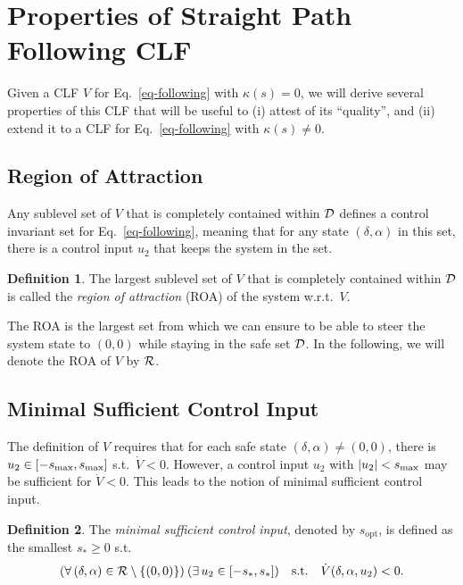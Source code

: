 \documentclass{article}
\theoremstyle{plain}
\theoremstyle{definition}
\newtheorem{definition}{Definition}
\theoremstyle{remark}
\newcommand{\smax}{s_\maxtxt}
\newcommand{\sopt}{s_{\mathrm{opt}}}
\begin{document}
\section{Properties of Straight Path Following CLF}\label{sec-straight-CLF}

Given a CLF $V$ for Eq.~\eqref{eq-following} with $\kappa(s)=0$, we will derive
several properties of this CLF that will be useful to (i) attest of its ``quality'',
and (ii) extend it to a CLF for Eq.~\eqref{eq-following} with $\kappa(s)\neq0$.

\subsection{Region of Attraction}

Any sublevel set of $V$ that is completely contained within $\mathcal{D}$ defines
a control invariant set for Eq.~\eqref{eq-following}, meaning that for any
state $(\delta,\alpha)$ in this set, there is a control input $u_2$ that keeps
the system in the set.

\begin{definition}\label{def-roa}
The largest sublevel set of $V$ that is completely contained within $\mathcal{D}$
is called the \emph{region of attraction} (ROA) of the system w.r.t.~$V$.
\end{definition}

The ROA is the largest set from which we can ensure to be able to steer the
system state to $(0,0)$ while staying in the safe set $\mathcal{D}$.
In the following, we will denote the ROA of $V$ by $\mathcal{R}$.

\subsection{Minimal Sufficient Control Input}

The definition of $V$ requires that for each safe state $(\delta,\alpha)\neq(0,0)$,
there is $u_2\in[-\smax,\smax]$ s.t.~$\dot{V}<0$.
However, a control input $u_2$ with $\lvert u_2\rvert<\smax$ may be sufficient for $\dot{V}<0$.
This leads to the notion of minimal sufficient control input.

\begin{definition}\label{def-sufficient-input}
The \emph{minimal sufficient control input}, denoted by $\sopt$, is defined as the smallest
$s_*\geq0$ s.t.
\begin{equation}\label{eq-lie-clf-sufficient}
(\forall\,(\delta,\alpha)\in\mathcal{R}\setminus\{(0,0)\})\:(\exists\,u_2\in[-s_*,s_*])
\quad\text{s.t.}\quad \dot{V}(\delta,\alpha,u_2) < 0.
\end{equation}
\end{definition}
\end{document}
